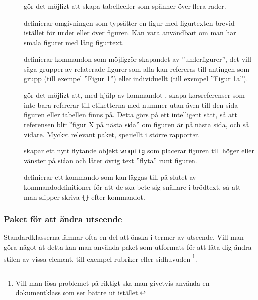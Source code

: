 \documentclass[lang=sv,ptsize=10pt,font=none,nomath,titles=bf,../../a4.tex]{subfiles}
\begin{document}
\begin{description}
	\item[]
	gör det möjligt att skapa tabellceller som spänner över flera
	rader.
	
	\item[]
	definierar omgivningen  som typsätter en figur med
	figurtexten brevid istället för under eller över figuren. Kan vara
	användbart om man har smala figurer med lång figurtext.
	
	\item[]
	definierar kommandon som möjliggör skapandet av ”underfigurer”, det
	vill säga grupper av relaterade figurer som alla kan refereras till
	antingen som grupp (till exempel ”Figur 1”) eller individuellt (till
	exempel ”Figur 1a”).
	
	\item[]
	gör det möjligt att, med hjälp av kommandot ,
	skapa korsreferenser
	som inte bara refererar till etiketterna med nummer utan även till den
	sida figuren eller tabellen finns på. Detta görs på ett intelligent
	sätt, så att referensen blir ”figur X på nästa sida” om figuren är på
	nästa sida, och så vidare. Mycket relevant paket, speciellt i större
	rapporter.
	
	\item[]
	skapar ett nytt flytande objekt \texttt{wrapfig} som placerar figuren
	till höger eller vänster på sidan och låter övrig text ”flyta” runt
	figuren.
	
	\item[]
	definierar ett kommando  som kan läggas till på slutet av
	kommandodefinitioner för att de ska bete sig snällare i brödtext, så
	att man slipper skriva \texttt{\{\}} efter kommandot.
\end{description}

\subsubsection{Paket för att ändra utseende}
Standardklasserna lämnar ofta en del att önska i termer av utseende. Vill
man göra något åt detta kan man använda paket som utformats för att låta
dig ändra stilen av vissa element, till exempel rubriker eller sidhuvuden%
\footnote{Vill man lösa problemet på riktigt ska man givetvis använda en
dokumentklass som ser bättre ut istället.}.
\end{document}

